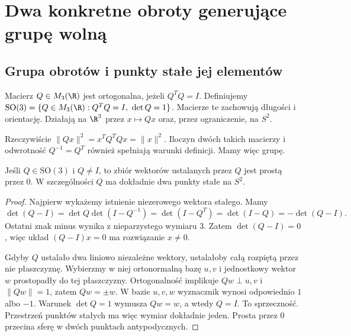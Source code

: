 \section{Dwa konkretne obroty generujące grupę wolną}
\subsection{Grupa obrotów i punkty stałe jej elementów}\label{subsec:so3}
\begin{definicja}
Macierz $Q\in M_3(\R)$ jest ortogonalna, jeżeli $Q^TQ=I$. Definiujemy $\mathrm{SO}(3)=\{Q\in M_3(\R):Q^TQ=I,\ \det Q=1\}$. Macierze te zachowują długości i orientację. Działają na $\R^3$ przez $x\mapsto Qx$ oraz, przez ograniczenie, na $S^2$.
\end{definicja}
Rzeczywiście $\|Qx\|^2=x^TQ^TQx=\|x\|^2$. Iloczyn dwóch takich macierzy i odwrotność $Q^{-1}=Q^T$ również spełniają warunki definicji. Mamy więc grupę.
\begin{lemat}\label{lem:os-obrotu}
Jeśli $Q\in\mathrm{SO}(3)$ i $Q\ne I$, to zbiór wektorów ustalanych przez $Q$ jest prostą przez $0$. W szczególności $Q$ ma dokładnie dwa punkty stałe na $S^2$.
\end{lemat}
\begin{proof}
Najpierw wykażemy istnienie niezerowego wektora stałego. Mamy
\[
 \det(Q-I)=\det Q\det(I-Q^{-1})=\det(I-Q^T)
 =\det(I-Q)=-\det(Q-I).
\]
Ostatni znak minus wynika z nieparzystego wymiaru $3$. Zatem $\det(Q-I)=0$, więc układ $(Q-I)x=0$ ma rozwiązanie $x\ne0$.

Gdyby $Q$ ustalało dwa liniowo niezależne wektory, ustalałoby całą rozpiętą przez nie płaszczyznę. Wybierzmy w niej ortonormalną bazę $u,v$ i jednostkowy wektor $w$ prostopadły do tej płaszczyzny. Ortogonalność implikuje $Qw\perp u,v$ i $\|Qw\|=1$, zatem $Qw=\pm w$. W bazie $u,v,w$ wyznacznik wynosi odpowiednio $1$ albo $-1$. Warunek $\det Q=1$ wymusza $Qw=w$, a wtedy $Q=I$. To sprzeczność. Przestrzeń punktów stałych ma więc wymiar dokładnie jeden. Prosta przez $0$ przecina sferę w dwóch punktach antypodycznych.
\end{proof}
